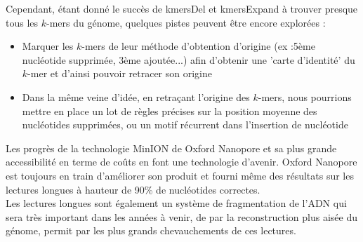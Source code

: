 \documentclass{report}
\begin{document}
    Cependant, étant donné le succès de kmersDel et kmersExpand à trouver presque tous les $k$-mers du génome, quelques pistes peuvent être encore explorées :\\
    \begin{itemize}
      \item Marquer les $k$-mers de leur méthode d'obtention d'origine (ex :5ème nucléotide supprimée, 3ème ajoutée...) afin d'obtenir une 'carte d'identité' du $k$-mer et d'ainsi pouvoir retracer son origine\\
      \item Dans la même veine d'idée, en retraçant l'origine des $k$-mers, nous pourrions mettre en place un lot de règles précises sur la position moyenne des nucléotides supprimées, ou un motif récurrent dans l'insertion de nucléotide
    \end{itemize}\medskip
    Les progrès de la technologie MinION de Oxford Nanopore et sa plus grande accessibilité en terme de coûts en font une technologie d'avenir. Oxford Nanopore est toujours en train d'améliorer son produit et fourni même des résultats sur les lectures longues à hauteur de 90\% de nucléotides correctes.\\

    Les lectures longues sont également un système de fragmentation de l'ADN qui sera très important dans les années à venir, de par la reconstruction plus aisée du génome, permit par les plus grands chevauchements de ces lectures.
    \newpage
  
  
\end{document}
